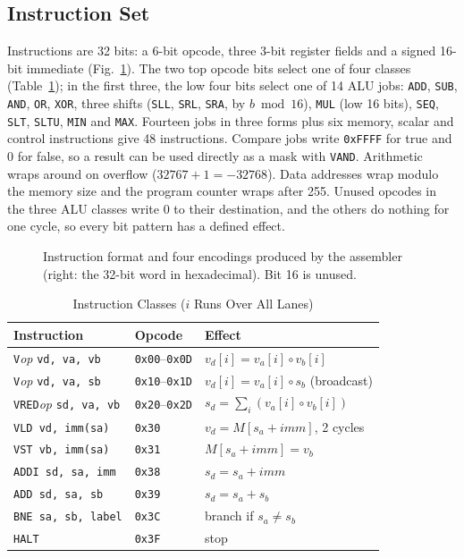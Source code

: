 \documentclass[journal]{IEEEtran}
\begin{document}
\subsection{Instruction Set}\label{sec:isa}
Instructions are 32 bits: a 6-bit opcode, three 3-bit register fields and a signed
16-bit immediate (Fig.~\ref{fig:format}). The two top opcode bits select one of four
classes (Table~\ref{tab:isa}); in the first three, the low four bits select one of 14
ALU jobs: \texttt{ADD}, \texttt{SUB}, \texttt{AND}, \texttt{OR}, \texttt{XOR}, three
shifts (\texttt{SLL}, \texttt{SRL}, \texttt{SRA}, by $b \bmod 16$), \texttt{MUL} (low
16 bits), \texttt{SEQ}, \texttt{SLT}, \texttt{SLTU}, \texttt{MIN} and \texttt{MAX}.
Fourteen jobs in three forms plus six memory, scalar and control instructions give 48
instructions. Compare jobs write \texttt{0xFFFF} for true and 0 for false, so a result
can be used directly as a mask with \texttt{VAND}. Arithmetic wraps around on overflow
($32767 + 1 = -32768$). Data addresses wrap modulo the memory size and the program counter wraps after
255. Unused opcodes in the three ALU classes write 0 to their destination, and the
others do nothing for one cycle, so every bit pattern has a defined effect.

\begin{figure}[t]
\centering

\caption{Instruction format and four encodings produced by the assembler (right: the
32-bit word in hexadecimal). Bit 16 is unused.}
\label{fig:format}
\end{figure}

\begin{table}[t]
\centering
\caption{Instruction Classes ($i$ Runs Over All Lanes)}
\label{tab:isa}
\footnotesize
\setlength{\tabcolsep}{3.5pt}
\begin{tabular}{lll}
\toprule
Instruction & Opcode & Effect \\
\midrule
\texttt{V}\emph{op} \texttt{vd, va, vb} & \texttt{0x00}--\texttt{0x0D} & $v_d[i] = v_a[i] \circ v_b[i]$ \\
\texttt{V}\emph{op} \texttt{vd, va, sb} & \texttt{0x10}--\texttt{0x1D} & $v_d[i] = v_a[i] \circ s_b$ (broadcast) \\
\texttt{VRED}\emph{op} \texttt{sd, va, vb} & \texttt{0x20}--\texttt{0x2D} & $s_d = \sum_i \left(v_a[i] \circ v_b[i]\right)$ \\
\texttt{VLD vd, imm(sa)}  & \texttt{0x30} & $v_d = M[s_a + \mathit{imm}]$, 2 cycles \\
\texttt{VST vb, imm(sa)}  & \texttt{0x31} & $M[s_a + \mathit{imm}] = v_b$ \\
\texttt{ADDI sd, sa, imm} & \texttt{0x38} & $s_d = s_a + \mathit{imm}$ \\
\texttt{ADD sd, sa, sb}   & \texttt{0x39} & $s_d = s_a + s_b$ \\
\texttt{BNE sa, sb, label}& \texttt{0x3C} & branch if $s_a \neq s_b$ \\
\texttt{HALT}             & \texttt{0x3F} & stop \\
\bottomrule
\end{tabular}
\end{table}
\end{document}

